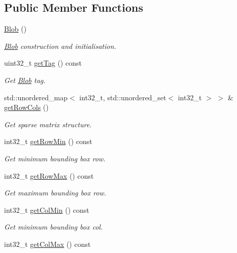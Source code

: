 \subsection*{Public Member Functions}
\begin{DoxyCompactItemize}
\item 
\hyperlink{classfc_1_1Blob_ac52255b13f4ce401de0a4310d846c62a}{Blob} ()
\begin{DoxyCompactList}\small\item\em \hyperlink{classfc_1_1Blob}{Blob} construction and initialisation. \end{DoxyCompactList}\item 
uint32\+\_\+t \hyperlink{classfc_1_1Blob_aeb84112e584a5e918530690b42cfd8f6}{get\+Tag} () const
\begin{DoxyCompactList}\small\item\em Get \hyperlink{classfc_1_1Blob}{Blob} tag. \end{DoxyCompactList}\item 
std\+::unordered\+\_\+map$<$ int32\+\_\+t, std\+::unordered\+\_\+set$<$ int32\+\_\+t $>$ $>$ \& \hyperlink{classfc_1_1Blob_a80e63b761ebffdf90dea47b8a59b2c32}{get\+Row\+Cols} ()
\begin{DoxyCompactList}\small\item\em Get sparse matrix structure. \end{DoxyCompactList}\item 
int32\+\_\+t \hyperlink{classfc_1_1Blob_a167b6c3a33f301a7dcb527b289dd0834}{get\+Row\+Min} () const
\begin{DoxyCompactList}\small\item\em Get minimum bounding box row. \end{DoxyCompactList}\item 
int32\+\_\+t \hyperlink{classfc_1_1Blob_af4a030b9ba08fd02242137a296a3692b}{get\+Row\+Max} () const
\begin{DoxyCompactList}\small\item\em Get maximum bounding box row. \end{DoxyCompactList}\item 
int32\+\_\+t \hyperlink{classfc_1_1Blob_ac4e8548eb6f47c1febbd70184bee315a}{get\+Col\+Min} () const
\begin{DoxyCompactList}\small\item\em Get minimum bounding box col. \end{DoxyCompactList}\item 
int32\+\_\+t \hyperlink{classfc_1_1Blob_a1f9cfacc7e5d2f048c26f8b9c706141a}{get\+Col\+Max} () const

\end{DoxyCompactItemize}
